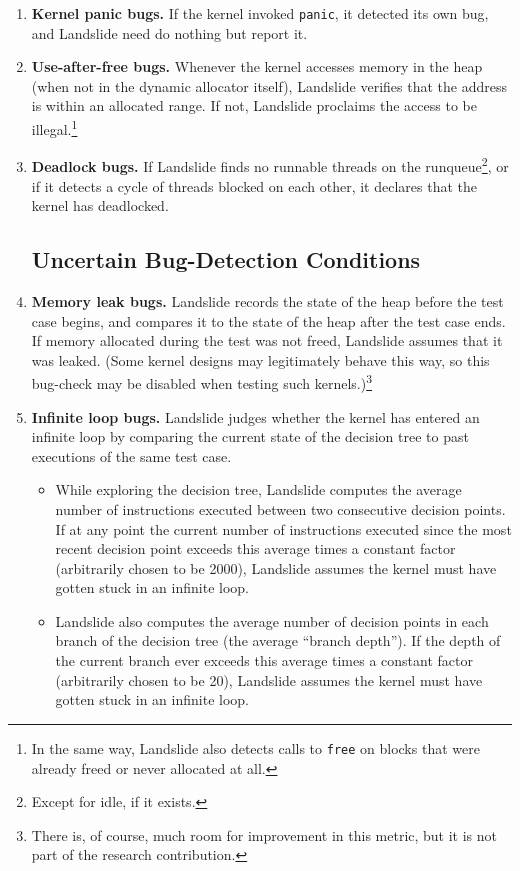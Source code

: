 \begin{enumerate}
	\item {\bf Kernel panic bugs.} If the kernel invoked \texttt{panic}, it detected its own bug, and Landslide need do nothing but report it.
	\item {\bf Use-after-free bugs.} Whenever the kernel accesses memory in the heap (when not in the dynamic allocator itself), Landslide verifies that the address is within an allocated range. If not, Landslide proclaims the access to be illegal.\footnote{In the same way, Landslide also detects calls to \texttt{free} on blocks that were already freed or never allocated at all.}
	\item {\bf Deadlock bugs.} If Landslide finds no runnable threads on the runqueue\footnote{Except for idle, if it exists.}, or if it detects a cycle of threads blocked on each other, it declares that the kernel has deadlocked.

\subsection{Uncertain Bug-Detection Conditions}

	\item {\bf Memory leak bugs.} Landslide records the state of the heap before the test case begins, and compares it to the state of the heap after the test case ends. If memory allocated during the test was not freed, Landslide assumes that it was leaked.
		(Some kernel designs may legitimately behave this way, so this bug-check may be disabled when testing such kernels.)\footnote{There is, of course, much room for improvement in this metric, but it is not part of the research contribution.}
	\item {\bf Infinite loop bugs.} Landslide judges whether the kernel has entered an infinite loop by comparing the current state of the decision tree to past executions of the same test case.
	\begin{itemize}
		\item While exploring the decision tree, Landslide computes the average number of instructions executed between two consecutive decision points. If at any point the current number of instructions executed since the most recent decision point exceeds this average times a constant factor (arbitrarily chosen to be 2000), Landslide assumes the kernel must have gotten stuck in an infinite loop.
		\item Landslide also computes the average number of decision points in each branch of the decision tree (the average ``branch depth''). If the depth of the current branch ever exceeds this average times a constant factor (arbitrarily chosen to be 20), Landslide assumes the kernel must have gotten stuck in an infinite loop.
	\end{itemize}
\end{enumerate}

